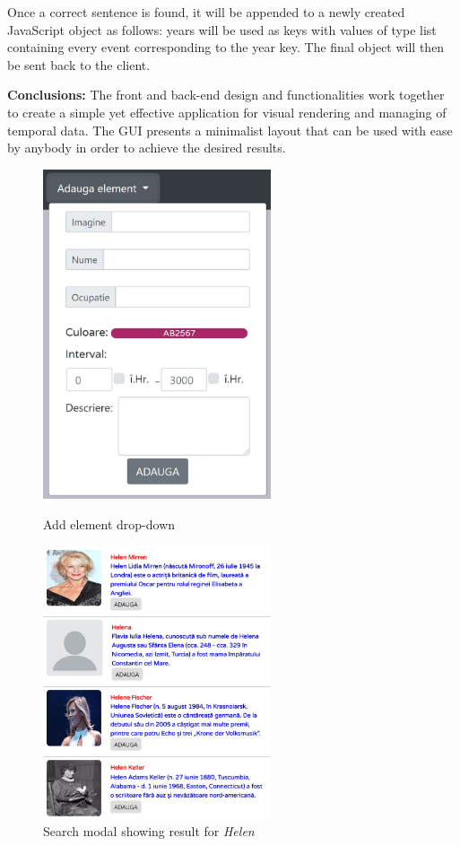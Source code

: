 \documentclass{report}
\begin{document}
Once a correct sentence is found, it will be appended to a newly created JavaScript object as follows: years will be used as keys with values of type list containing every event corresponding to the year key. The final object will then be sent back to the client.\par

\textbf{Conclusions:} The front and back-end design and functionalities work together to create a simple yet effective application for visual rendering and managing of temporal data. The GUI presents a minimalist layout that can be used with ease by anybody in order to achieve the desired results.

\begin{figure}[b]
        \centering
		\vspace*{-3cm}
        \includegraphics[width=0.6\textwidth]{addbtn}
        \caption{Add element drop-down}

        \centering
		\vspace*{1.5cm}
        \includegraphics[width=0.6\textwidth]{helen}
        \caption{Search modal showing result for \textit{Helen}}
\end{figure}
\end{document}
